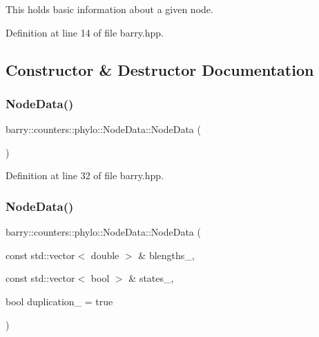 This holds basic information about a given node. 

Definition at line 14 of file barry.\+hpp.



\subsection{Constructor \& Destructor Documentation}
\mbox{\label{classbarry_1_1counters_1_1phylo_1_1_node_data_ab6c4e49f9964d587e4fba24f9bb41b30}} 
\subsubsection{\texorpdfstring{Node\+Data()}{NodeData()}\hspace{0.1cm}{\footnotesize\ttfamily [1/2]}}
{\footnotesize\ttfamily barry\+::counters\+::phylo\+::\+Node\+Data\+::\+Node\+Data (\begin{DoxyParamCaption}{ }\end{DoxyParamCaption})\hspace{0.3cm}{\ttfamily [inline]}}



Definition at line 32 of file barry.\+hpp.

\mbox{\label{classbarry_1_1counters_1_1phylo_1_1_node_data_a0559756b8139d402af5046755992d83a}} 
\subsubsection{\texorpdfstring{Node\+Data()}{NodeData()}\hspace{0.1cm}{\footnotesize\ttfamily [2/2]}}
{\footnotesize\ttfamily barry\+::counters\+::phylo\+::\+Node\+Data\+::\+Node\+Data (\begin{DoxyParamCaption}\item[{const std\+::vector$<$ double $>$ \&}]{blengths\+\_\+,  }\item[{const std\+::vector$<$ bool $>$ \&}]{states\+\_\+,  }\item[{bool}]{duplication\+\_\+ = {\ttfamily true} }\end{DoxyParamCaption})\hspace{0.3cm}{\ttfamily [inline]}}



